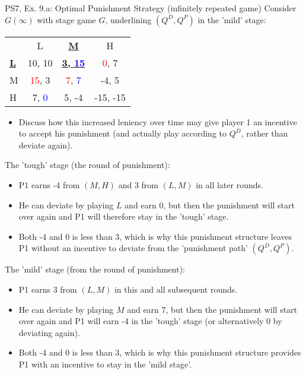 \begin{frame}{PS7, Ex. 9.a: Optimal Punishment Strategy (infinitely repeated game)}
    Consider $G(\infty)$ with stage game $G$, underlining $(Q^D,Q^P)$ in the 'mild' stage: \vspace{-6pt}
    \begin{table}
      \begin{tabular}{l|c|c|c|}
        \multicolumn{1}{c}{} & \multicolumn{1}{c}{L} & \multicolumn{1}{c}{\textbf{\underline{M}}} & \multicolumn{1}{c}{H} \\\cline{2-4}
        \textbf{\underline{L}} & 10, 10 & \textbf{\underline{3, \textcolor{blue}{15}}} & \textcolor{red}{0}, 7 \\\cline{2-4}
        M & \textcolor{red}{15}, 3 & \textcolor{red}{7}, \textcolor{blue}{7} & -4, 5 \\\cline{2-4}
        H & 7, \textcolor{blue}{0} & 5, -4 & -15, -15 \\\cline{2-4}
      \end{tabular}
    \end{table}
    \vspace{-6pt}
    \begin{itemize}
      \item[(a)] Discuss how this increased leniency over time may give player 1 an incentive to accept his punishment (and actually play according to $Q^D$, rather than deviate again).
    \end{itemize}
    \vspace{-8pt}
  \begin{multicols}{2}
    The 'tough' stage (the  round of punishment):\vspace{-6pt}
    \begin{itemize}
      \item P1 earns -4 from $(M, H)$ and 3 from $(L, M)$ in all later rounds.
      \item He can deviate by playing $L$ and earn 0, but then the punishment will start over again and P1 will therefore stay in the 'tough' stage.
      \item Both -4 and 0 is less than 3, which is why this punishment structure leaves P1 without an incentive to deviate from the 'punishment path' $(Q^D,Q^P)$.
    \end{itemize}
    \vfill\null\columnbreak
    The 'mild' stage (from the  round of punishment):\vspace{-6pt}
    \begin{itemize}
      \item P1 earns 3 from $(L, M)$ in this and all subsequent rounds.
      \item He can deviate by playing $M$ and earn 7, but then the punishment will start over again and P1 will earn -4 in the 'tough' stage (or alternatively 0 by deviating again).
      \item Both -4 and 0 is less than 3, which is why this punishment structure provides P1 with an incentive to stay in the 'mild stage'.
    \end{itemize}
    \vfill\null
  \end{multicols}
\end{frame}

